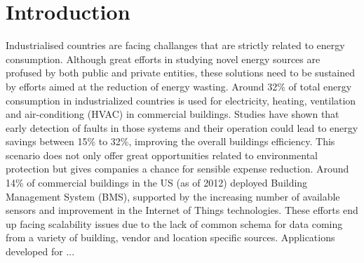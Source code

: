 \chapter*{Introduction}
\label{ch:introduction}
Industrialised countries are facing challanges that are strictly related to energy consumption. Although great efforts in studying novel energy sources are profused by both public and private entities, these solutions need to be sustained by efforts aimed at the reduction of energy wasting. Around 32\% of total energy consumption in industrialized countries is used for electricity, heating, ventilation and air-conditiong (HVAC) in commercial buildings. Studies have shown that early detection of faults in those systems and their operation could lead to energy savings between 15\% to 32\%, improving the overall buildings efficiency. This scenario does not only offer great opportunities related to environmental protection but gives companies a chance for sensible expense reduction. Around 14\% of commercial buildings in the US (as of 2012) deployed Building Management System (BMS), supported by the increasing number of available sensors and improvement in the Internet of Things technologies. These efforts end up facing scalability issues due to the lack of common schema for data coming from a variety of building, vendor and location specific sources. Applications developed for ... %
